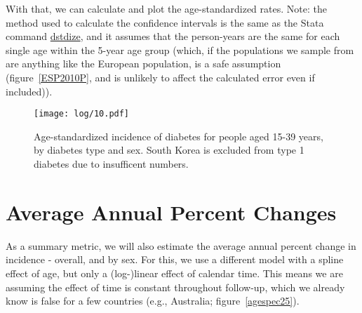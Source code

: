 \documentclass[11pt]{article}
\begin{document}
\clearpage

With that, we can calculate and plot the age-standardized rates.
Note: the method used to calculate the confidence intervals is the 
same as the Stata command \href{https://www.stata.com/manuals/rdstdize.pdf}{dstdize}, and it assumes that the person-years
are the same for each single age within the 5-year age group (which, if the 
populations we sample from are anything like the European population, is 
a safe assumption (figure~\ref{ESP2010P}, and is unlikely to affect the calculated
error even if included)).

\color{Blue4}
\begin{stlog}\end{stlog}
\begin{figure}
    \centering
    \texttt{[image: log/10.pdf]}
    \caption{Age-standardized incidence of diabetes for people aged 15-39 years, by diabetes type and sex. South Korea is excluded from type 1 diabetes due to insufficent numbers.}
    \label{STDfig}
\end{figure}
\begin{stlog}\end{stlog}
\color{black}

\clearpage
\section{Average Annual Percent Changes}

As a summary metric, we will also estimate the average annual percent change
in incidence - overall, and by sex. For this, we use a different model with a spline effect
of age, but only a (log-)linear effect of calendar time. This means we are assuming the effect of time
is constant throughout follow-up, which we already know is false for a few countries (e.g., Australia;
figure~\ref{agespec25}). \\

\color{Blue4}
\begin{stlog}\end{stlog}
\color{black}
\end{document}
